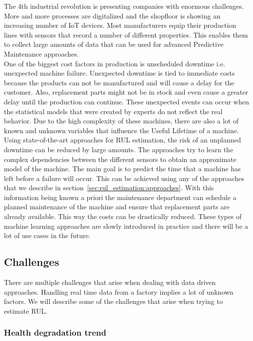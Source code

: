 The 4th industrial revolution is presenting companies with enormous challenges. More and more processes are digitalized and the shopfloor is showing an increasing number of IoT devices. Most manufacturers equip their production lines with sensors that record a number of different properties. This enables them to collect large amounts of data that can be used for advanced Predictive Maintenance approaches.\\
One of the biggest cost factors in production is unscheduled downtime i.e. unexpected machine failure. Unexpected downtime is tied to immediate costs because the products can not be manufactured and will cause a delay for the customer. Also, replacement parts might not be in stock and even cause a greater delay until the production can continue. These unexpected events can occur when the statistical models that were created by experts do not reflect the real behavior. Due to the high complexity of these machines, there are also a lot of known and unknown variables that influence the Useful Lifetime of a machine. Using state-of-the-art approaches for RUL estimation, the risk of an unplanned downtime can be reduced by large amounts. The approaches try to learn the complex dependencies between the different sensors to obtain an approximate model of the machine. The main goal is to predict the time that a machine has left before a failure will occur. This can be achieved using any of the approaches that we describe in section~\ref{sec:rul_estimation:approaches}. With this information being known a priori the maintenance department can schedule a planned maintenance of the machine and ensure that replacement parts are already available. This way the costs can be drastically reduced. These types of machine learning approaches are slowly introduced in practice and there will be a lot of use cases in the future.

\subsection*{Challenges}
\label{sec:rul_estimation:motivation:challenges}

There are multiple challenges that arise when dealing with data driven approaches. Handling real time data from a factory implies a lot of unknown factors. We will describe some of the challenges that arise when trying to estimate RUL.

\subsubsection*{Health degradation trend}

